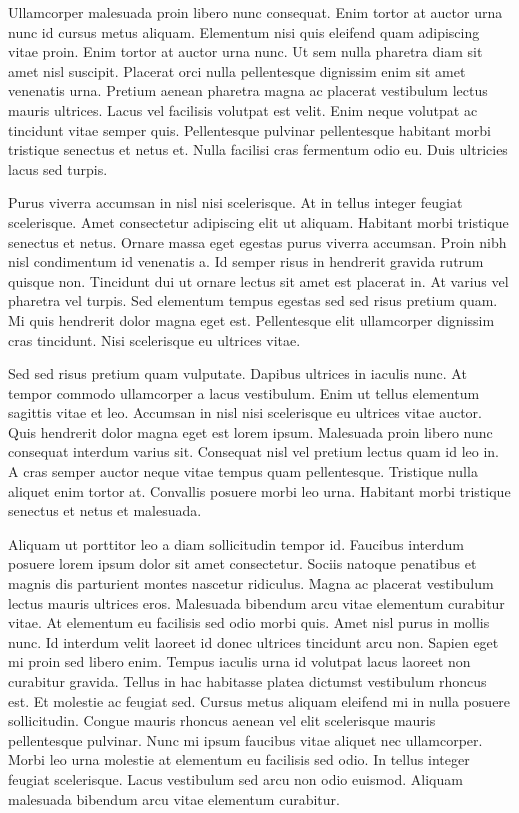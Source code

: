 \documentclass[11pt,a4paper]{article}
\begin{document}
Ullamcorper malesuada proin libero nunc consequat. Enim tortor at auctor urna nunc id cursus metus aliquam. Elementum nisi quis eleifend quam adipiscing vitae proin. Enim tortor at auctor urna nunc. Ut sem nulla pharetra diam sit amet nisl suscipit. Placerat orci nulla pellentesque dignissim enim sit amet venenatis urna. Pretium aenean pharetra magna ac placerat vestibulum lectus mauris ultrices. Lacus vel facilisis volutpat est velit. Enim neque volutpat ac tincidunt vitae semper quis. Pellentesque pulvinar pellentesque habitant morbi tristique senectus et netus et. Nulla facilisi cras fermentum odio eu. Duis ultricies lacus sed turpis.

Purus viverra accumsan in nisl nisi scelerisque. At in tellus integer feugiat scelerisque. Amet consectetur adipiscing elit ut aliquam. Habitant morbi tristique senectus et netus. Ornare massa eget egestas purus viverra accumsan. Proin nibh nisl condimentum id venenatis a. Id semper risus in hendrerit gravida rutrum quisque non. Tincidunt dui ut ornare lectus sit amet est placerat in. At varius vel pharetra vel turpis. Sed elementum tempus egestas sed sed risus pretium quam. Mi quis hendrerit dolor magna eget est. Pellentesque elit ullamcorper dignissim cras tincidunt. Nisi scelerisque eu ultrices vitae.

Sed sed risus pretium quam vulputate. Dapibus ultrices in iaculis nunc. At tempor commodo ullamcorper a lacus vestibulum. Enim ut tellus elementum sagittis vitae et leo. Accumsan in nisl nisi scelerisque eu ultrices vitae auctor. Quis hendrerit dolor magna eget est lorem ipsum. Malesuada proin libero nunc consequat interdum varius sit. Consequat nisl vel pretium lectus quam id leo in. A cras semper auctor neque vitae tempus quam pellentesque. Tristique nulla aliquet enim tortor at. Convallis posuere morbi leo urna. Habitant morbi tristique senectus et netus et malesuada.

Aliquam ut porttitor leo a diam sollicitudin tempor id. Faucibus interdum posuere lorem ipsum dolor sit amet consectetur. Sociis natoque penatibus et magnis dis parturient montes nascetur ridiculus. Magna ac placerat vestibulum lectus mauris ultrices eros. Malesuada bibendum arcu vitae elementum curabitur vitae. At elementum eu facilisis sed odio morbi quis. Amet nisl purus in mollis nunc. Id interdum velit laoreet id donec ultrices tincidunt arcu non. Sapien eget mi proin sed libero enim. Tempus iaculis urna id volutpat lacus laoreet non curabitur gravida. Tellus in hac habitasse platea dictumst vestibulum rhoncus est. Et molestie ac feugiat sed. Cursus metus aliquam eleifend mi in nulla posuere sollicitudin. Congue mauris rhoncus aenean vel elit scelerisque mauris pellentesque pulvinar. Nunc mi ipsum faucibus vitae aliquet nec ullamcorper. Morbi leo urna molestie at elementum eu facilisis sed odio. In tellus integer feugiat scelerisque. Lacus vestibulum sed arcu non odio euismod. Aliquam malesuada bibendum arcu vitae elementum curabitur.
\end{document}
